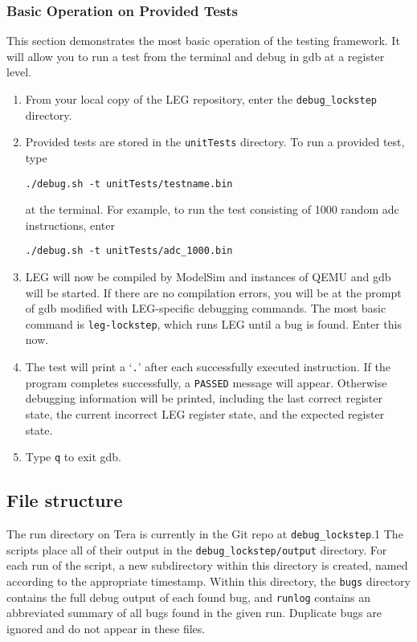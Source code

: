 \subsubsection{Basic Operation on Provided Tests}
This section demonstrates the most basic operation of the testing framework.
It will allow you to run a test from the terminal and debug in gdb at a register level.
\begin{enumerate}
\item From your local copy of the LEG repository, enter the \texttt{debug\_lockstep} directory.
\item Provided tests are stored in the \texttt{unitTests} directory. 
 To run a provided test, type 
 \begin{verbatim}./debug.sh -t unitTests/testname.bin\end{verbatim}
 at the terminal. For example, to run the test consisting of 1000 random adc instructions, enter 
 \begin{verbatim}./debug.sh -t unitTests/adc_1000.bin\end{verbatim}
\item LEG will now be compiled by ModelSim and instances of QEMU and gdb will be started.
 If there are no compilation errors, you will be at the prompt of gdb modified with LEG-specific debugging commands.
 The most basic command is \texttt{leg-lockstep}, which runs LEG until a bug is found.
 Enter this now.
\item The test will print a `\texttt{.}' after each successfully executed instruction.
 If the program completes successfully, a \texttt{PASSED} message will appear.
 Otherwise debugging information will be printed, including the last correct register state, the current incorrect LEG register state, and the expected register state.
\item Type \texttt{q} to exit gdb.
\end{enumerate}


\subsection{File structure}
The run directory on Tera is currently in the Git repo at \texttt{debug\_lockstep}.1 The scripts place all of their output in the \texttt{debug\_lockstep/output} directory. For each run of the script, a new subdirectory within this directory is created, named according to the appropriate timestamp. Within this directory, the \texttt{bugs} directory contains the full debug output of each found bug, and \texttt{runlog} contains an abbreviated summary of all bugs found in the given run. Duplicate bugs are ignored and do not appear in these files.

